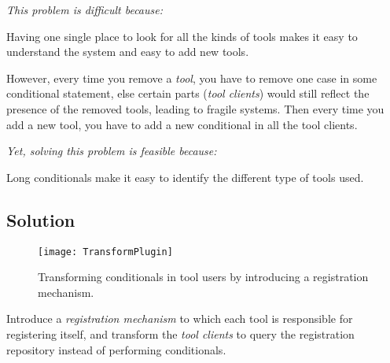 \documentclass[a4paper,10pt,twoside]{book}
\begin{document}
\emph{This problem is difficult because:}

\begin{bulletlist}
\item Having one single place to look for all the kinds of tools makes it easy to understand the system and easy to add new tools.

\item However, every time you remove a \emph{tool}, you have to remove one case in some conditional statement, else certain parts (\emph{tool clients}) would still reflect the presence of the removed tools, leading to fragile systems. Then every time you add a new tool, you have to add a new conditional in all the tool clients. 
\end{bulletlist}

\emph{Yet, solving this problem is feasible because:}

\begin{bulletlist}
\item Long conditionals make it easy to identify the different type of tools used.
\end{bulletlist}

\subsection*{Solution}

\begin{figure}
\begin{center}
\texttt{[image: TransformPlugin]}
\caption{Transforming conditionals in tool users by introducing a registration mechanism.}
\end{center}
\end{figure}

Introduce a \emph{registration mechanism} to which each tool is responsible for registering itself, and transform the \emph{tool clients} to query the registration repository instead of performing conditionals. 
\end{document}
